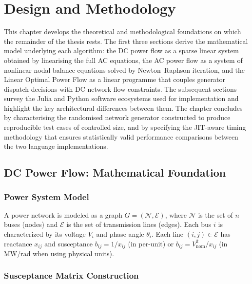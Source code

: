 \chapter{Design and Methodology}
\label{ch:methodology}

This chapter develops the theoretical and methodological foundations on which the remainder of the thesis rests. The first three sections derive the mathematical model underlying each algorithm: the DC power flow as a sparse linear system obtained by linearising the full AC equations, the AC power flow as a system of nonlinear nodal balance equations solved by Newton--Raphson iteration, and the Linear Optimal Power Flow as a linear programme that couples generator dispatch decisions with DC network flow constraints. The subsequent sections survey the Julia and Python software ecosystems used for implementation and highlight the key architectural differences between them. The chapter concludes by characterising the randomised network generator constructed to produce reproducible test cases of controlled size, and by specifying the JIT-aware timing methodology that ensures statistically valid performance comparisons between the two language implementations.

\section{DC Power Flow: Mathematical Foundation}

\subsection{Power System Model}

A power network is modeled as a graph $G = (\mathcal{N}, \mathcal{E})$, where $\mathcal{N}$ is the set of $n$ buses (nodes) and $\mathcal{E}$ is the set of transmission lines (edges). Each bus $i$ is characterized by its voltage $V_i$ and phase angle $\theta_i$. Each line $(i,j) \in \mathcal{E}$ has reactance $x_{ij}$ and susceptance $b_{ij} = 1/x_{ij}$ (in per-unit) or $b_{ij} = V_\text{nom}^2 / x_{ij}$ (in MW/rad when using physical units).

\subsection{Susceptance Matrix Construction}

